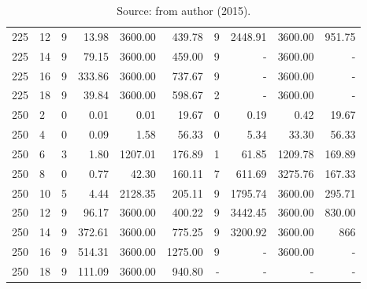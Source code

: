 \begin{appendices}
\begin{table*}[h]
\begin{center}
\begin{tabular} {l l | r r r r | r r r r}
225 & 12  &  9            &  13.98         &  3600.00     &  439.78    &  9           &  2448.91         &  3600.00    &  951.75    \\ 
225 & 14  &  9            &  79.15         &  3600.00     &  459.00    &  9           &  -               &  3600.00    &  -         \\ 
225 & 16  &  9            &  333.86        &  3600.00     &  737.67    &  9           &  -               &  3600.00    &  -         \\ 
225 & 18  &  9            &  39.84         &  3600.00     &  598.67    &  2           &  -               &  3600.00    &  -         \\ 
250 & 2   &  0            &  0.01          &  0.01        &  19.67     &  0           &  0.19            &  0.42       &  19.67     \\ 
250 & 4   &  0            &  0.09          &  1.58        &  56.33     &  0           &  5.34            &  33.30      &  56.33     \\ 
250 & 6   &  3            &  1.80          &  1207.01     &  176.89    &  1           &  61.85           &  1209.78    &  169.89    \\ 
250 & 8   &  0            &  0.77          &  42.30       &  160.11    &  7           &  611.69          &  3275.76    &  167.33    \\ 
250 & 10  &  5            &  4.44          &  2128.35     &  205.11    &  9           &  1795.74         &  3600.00    &  295.71    \\ 
250 & 12  &  9            &  96.17         &  3600.00     &  400.22    &  9           &  3442.45         &  3600.00    &  830.00    \\ 
250 & 14  &  9            &  372.61        &  3600.00     &  775.25    &  9           &  3200.92         &  3600.00    &  866       \\ 
250 & 16  &  9            &  514.31        &  3600.00     &  1275.00   &  9           &  -               &  3600.00    &  -         \\ 
250 & 18  &  9            &  111.09        &  3600.00     &  940.80    &  -           &  -               &  -          &  -         \\ 
\hline
\end{tabular}\caption*{Source: from author (2015).}
\end{center}
\end{table*}



\end{appendices}

